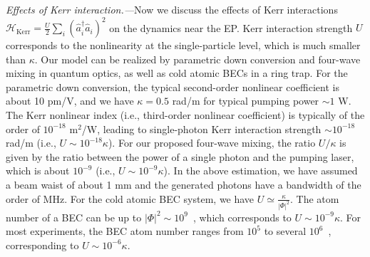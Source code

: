 \documentclass[twocolumn,prl,floatfix,citeautoscript,nofootinbib,superscriptaddress]{revtex4}
\begin{document}
\begin{widetext}
\emph{{\color{blue}Effects of Kerr interaction}.---}Now we discuss the
effects of Kerr interactions~\cite%
{PhysRevA.94.033841S,ncomms11417S,PhysRevA.98.042118S,PhysRevLett.123.173601S,PhysRevLett.125.240405S,PhysRevA.103.033711S,arXiv:2107.04503S}
$\mathcal{H}_\text{Kerr}=\frac{U}{2}\sum_{i}(\hat{a}_{i}^{\dag }\hat{a}%
_{i})^{2}$ on the dynamics near the EP. Kerr interaction strength $U$
corresponds to the nonlinearity at the single-particle level, which is much
smaller than $\kappa $. Our model can be realized by parametric down
conversion and four-wave mixing in quantum optics, as well as cold atomic
BECs in a ring trap. For the parametric down conversion, the typical
second-order nonlinear coefficient is about 10 pm/V, and we have $\kappa =0.5
$ rad/m for typical pumping power $\sim 1$ W. The Kerr nonlinear index
(i.e., third-order nonlinear coefficient) is typically of the order of $%
10^{-18}$ m$^{2}$/W, leading to single-photon Kerr interaction strength $%
\sim 10^{-18}$ rad/m (i.e., $U\sim 10^{-18}\kappa $). For our proposed
four-wave mixing, the ratio $U/\kappa $ is given by the ratio between the
power of a single photon and the pumping laser, which is about $10^{-9}$
(i.e., $U\sim 10^{-9}\kappa $). In the above estimation, we have assumed a
beam waist of about 1 mm and the generated photons have a bandwidth of the
order of MHz. For the cold atomic BEC system, we have $U\simeq \frac{\kappa
}{|\Phi |^{2}}$. The atom number of a BEC can be up to $|\Phi |^{2}\sim
10^{9}$~\cite{PhysRevLett.81.3811S}, which corresponds to $U\sim
10^{-9}\kappa $. For most experiments, the BEC atom number ranges from $%
10^{5}$ to several $10^{6}$~\cite{PhysRep.529.265S}, corresponding to $U\sim
10^{-6}\kappa $.


\end{widetext}
\end{document}
